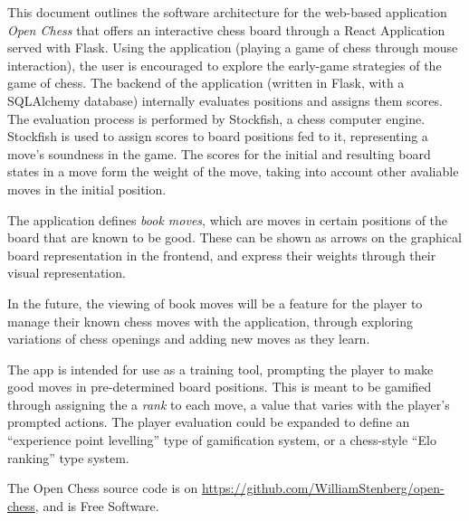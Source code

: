 \documentclass[architecture.tex]{subfiles}
\begin{document}
This document outlines the software architecture for the 
web-based application \textit{Open Chess} that offers
an interactive chess board through a React Application
served with Flask. 
Using the application (playing a game of chess through mouse interaction),
the user is encouraged to explore the early-game strategies of the game of chess.
The backend of the application (written in Flask, with a SQLAlchemy database) 
internally evaluates positions and assigns them scores. 
The evaluation process is performed by Stockfish, a chess computer engine. 
Stockfish is used to assign scores to board positions fed to it, 
representing a move's soundness in the game. 
The scores for the initial and resulting board states in a move
form the weight of the move, taking into account 
other avaliable moves in the initial position.

The application defines \textit{book moves}, which are moves in certain
positions of the board that are known to be good.
These can be shown as arrows on the graphical board representation in the frontend,
and express their weights through their visual representation.

In the future, the viewing of book moves will be a feature for the player
to manage their known chess moves with the application, through exploring
variations of chess openings and adding new moves as they learn.

The app is intended for use as a training tool, prompting the player
to make good moves in pre-determined board positions.
This is meant to be gamified through assigning the a \textit{rank} to each move,
a value that varies with the player's prompted actions.
The player evaluation could be expanded to define an 
``experience point levelling'' type of gamification system, or a chess-style 
``Elo ranking'' type system.

The Open Chess source code is on \url{https://github.com/WilliamStenberg/open-chess},
and is Free Software.
\end{document}
